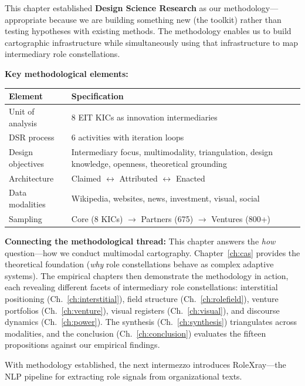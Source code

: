 \documentclass[../main.tex]{subfiles}
\begin{document}
\begin{summarybox}
This chapter established \textbf{Design Science Research} as our methodology---appropriate because we are building something new (the \RoleBox{} toolkit) rather than testing hypotheses with existing methods. The methodology enables us to build cartographic infrastructure while simultaneously using that infrastructure to map intermediary role constellations.

\vspace{0.5em}
\textbf{Key methodological elements:}

\begin{center}
\small
\begin{tabular}{@{}p{3cm}p{6.5cm}@{}}
\toprule
\textbf{Element} & \textbf{Specification} \\
\midrule
Unit of analysis & 8 EIT KICs as innovation intermediaries \\
DSR process & 6 activities with iteration loops \\
Design objectives & Intermediary focus, multimodality, triangulation, design knowledge, openness, theoretical grounding \\
Architecture & Claimed $\leftrightarrow$ Attributed $\leftrightarrow$ Enacted \\
Data modalities & Wikipedia, websites, news, investment, visual, social \\
Sampling & Core (8 KICs) $\rightarrow$ Partners (675) $\rightarrow$ Ventures (800+) \\
\bottomrule
\end{tabular}
\end{center}

\vspace{0.5em}
\textbf{Connecting the methodological thread:} This chapter answers the \emph{how} question---how we conduct multimodal cartography. Chapter~\ref{ch:cas} provides the theoretical foundation (\emph{why} role constellations behave as complex adaptive systems). The empirical chapters then demonstrate the methodology in action, each revealing different facets of intermediary role constellations: interstitial positioning (Ch.~\ref{ch:interstitial}), field structure (Ch.~\ref{ch:rolefield}), venture portfolios (Ch.~\ref{ch:venture}), visual registers (Ch.~\ref{ch:visual}), and discourse dynamics (Ch.~\ref{ch:power}). The synthesis (Ch.~\ref{ch:synthesis}) triangulates across modalities, and the conclusion (Ch.~\ref{ch:conclusion}) evaluates the fifteen propositions against our empirical findings.
\end{summarybox}

\vspace{1em}
With methodology established, the next intermezzo introduces RoleXray---the NLP pipeline for extracting role signals from organizational texts.

\clearpage
\end{document}

